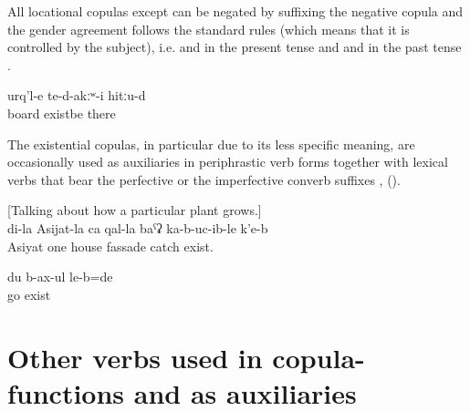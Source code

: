 All locational copulas except  can be negated by suffixing the negative copula and the gender agreement follows the standard rules (which means that it is controlled by the subject), i.e.  and   in the present tense and  and  in the past tense .
%
\begin{exe}
	\ex	\label{ex:There were no boards there}
	\gll	urq'l-e	te-d-akːʷ-i	hitːu-d\\
		board	existbe	there\\
	\glt	{}
\end{exe}

The existential copulas, in particular  due to its less specific meaning, are occasionally used as auxiliaries in periphrastic verb forms together with lexical verbs that bear the perfective or the imperfective converb suffixes ,  ().
%
\begin{exe}
	\ex	\label{ex:[Talking about how a particular plant grows.] ‎‎[It can become large], at my Asjiat's place it covered one wall of the house}
	[Talking about how a particular plant grows.]\\
	\gll	di-la	Asijat-la	ca	qal-la	baˁʡ	ka-b-uc-ib-le	k'e-b\\
			Asiyat	one	house	fassade	catch	exist.\\
	\glt	{}

	\ex	\label{ex:[at the time when the fox was born], I went run around (said the wolf)}
	\gll	du	b-ax-ul	le-b=de\\
			go	exist\\
	\glt	{}
\end{exe}



\section{Other verbs used in copula-functions and as auxiliaries}
\label{sec:Other verbs used in copula-functions and as auxiliaries}

